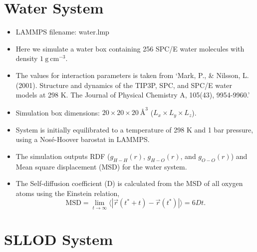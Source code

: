\documentclass[12pt]{article}
\begin{document}
\newpage
\section{Water System}
\begin{itemize}
\item LAMMPS filename: water.lmp
\item Here we simulate a water box containing 256 SPC/E water molecules with 
density $1 \ \textrm{g} \ \textrm{cm}^{-3}$.
\item The values for interaction parameters is taken from 
`Mark, P., \& Nilsson, L. (2001). Structure and dynamics of the TIP3P, SPC, and SPC/E water models at 298 K. The Journal of Physical Chemistry A, 105(43), 9954-9960.'
\item Simulation box dimensions: $20 \times 20 \times 20 \ \textrm{\AA}^{3}$ 
($L_{x} \times L_{y} \times L_{z}$).
\item System is initially equilibrated to a temperature of 298 K and 1 bar pressure, 
using a Nos\'e-Hoover barostat in LAMMPS.
\item The simulation outputs RDF ($g_{H-H}(r)$, $g_{H-O}(r)$, and $g_{O-O}(r)$) and 
Mean square displacement (MSD) for the water system.
\item The Self-diffusion coefficient (D) is calculated from the MSD of all oxygen 
atoms using the Einstein relation,
$$\textrm{MSD} = \lim_{t\to\infty}\langle |\vec{r}(t^{*}+t) - \vec{r}(t^{*})|\rangle = 6Dt.$$
\end{itemize}

\section{SLLOD System}



\end{document}
